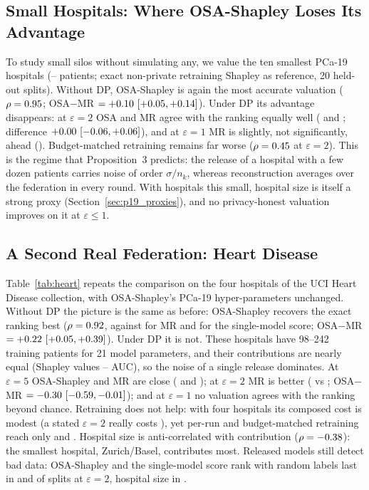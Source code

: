 \subsection{Small Hospitals: Where OSA-Shapley Loses Its Advantage}
\label{sec:p19_small}
To study small silos without simulating any, we value the ten smallest PCa-19 hospitals (\pxSmallMin--\pxSmallMax{} patients; exact non-private retraining Shapley as reference, 20 held-out splits). Without DP, OSA-Shapley is again the most accurate valuation ($\rho=0.95$; OSA$-$MR $=+0.10\ [+0.05, +0.14]$). Under DP its advantage disappears: at $\varepsilon=2$ OSA and MR agree with the ranking equally well (\pxSOsaTwo{} and \pxSMrTwo{}; difference $+0.00\ [-0.06, +0.06]$), and at $\varepsilon=1$ MR is slightly, not significantly, ahead (\pxdSMrOne). Budget-matched retraining remains far worse ($\rho=0.45$ at $\varepsilon=2$). This is the regime that Proposition~3 predicts: the release of a hospital with a few dozen patients carries noise of order $\sigma/n_k$, whereas reconstruction averages over the federation in every round. With hospitals this small, hospital size is itself a strong proxy (Section~\ref{sec:p19_proxies}), and no privacy-honest valuation improves on it at $\varepsilon \le 1$.


\subsection{A Second Real Federation: Heart Disease}
\label{sec:heart}
Table~\ref{tab:heart} repeats the comparison on the four hospitals of the UCI Heart Disease collection, with OSA-Shapley's PCa-19 hyper-parameters unchanged. Without DP the picture is the same as before: OSA-Shapley recovers the exact ranking best ($\rho=0.92$, against \hrMrNoDP{} for MR and \hrRefNoDP{} for the single-model score; OSA$-$MR $=+0.22\ [+0.05, +0.39]$). Under DP it is not. These hospitals have 98--242 training patients for 21 model parameters, and their contributions are nearly equal (Shapley values \hrPhiMin--\hrPhiMax{} AUC), so the noise of a single release dominates. At $\varepsilon=5$ OSA-Shapley and MR are close (\hrOsaFive{} and \hrMrFive{}); at $\varepsilon=2$ MR is better (\hrMrTwo{} vs \hrOsaTwo{}; OSA$-$MR $=-0.30\ [-0.59, -0.01]$); and at $\varepsilon=1$ no valuation agrees with the ranking beyond chance. Retraining does not help: with four hospitals its composed cost is modest (a stated $\varepsilon=2$ really costs \hrTrueTwo), yet per-run and budget-matched retraining reach only \hrPrTwo{} and \hrBmTwo{}. Hospital size is anti-correlated with contribution ($\rho=-0.38$): the smallest hospital, Zurich/Basel, contributes most. Released models still detect bad data: OSA-Shapley and the single-model score rank \hrCorrupt{} with random labels last in \hrCOsaTwo{} and \hrCRefTwo{} of splits at $\varepsilon=2$, hospital size in \hrCSizeTwo.

